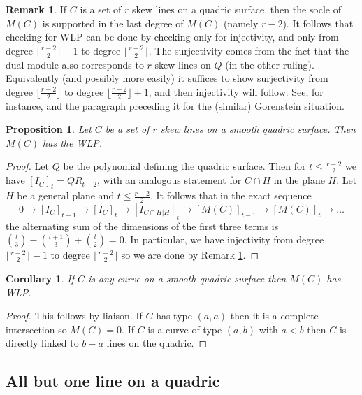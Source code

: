 \documentclass[12pt]{amsart}%
\numberwithin{equation}{section}
\newtheorem{proposition}[theorem]{Proposition}
\newtheorem{corollary}[theorem]{Corollary}
\theoremstyle{definition}
\newtheorem{remark}[theorem]{Remark}
\numberwithin{equation}{section}
\begin{document}
\begin{remark} \label{enough}
    If $C$ is a set of $r$ skew lines on a quadric surface, then the socle of $M(C)$ is supported in the last degree of $M(C)$ (namely $r-2$). It follows that checking for WLP can be done by checking only for injectivity, and only from degree $\lfloor \frac{r-2}{2} \rfloor -1$ to degree $\lfloor \frac{r-2}{2} \rfloor$. The surjectivity comes from the fact that the dual module also corresponds to $r$ skew lines on $Q$ (in the other ruling). Equivalently (and possibly more easily) it suffices to show surjectivity from degree $\lfloor \frac{r-2}{2} \rfloor$ to degree $\lfloor \frac{r-2}{2} \rfloor +1$, and then injectivity will follow. See, for instance, \cite[Proposition 2.6]{BMMN}  and the paragraph preceding it for the (similar) Gorenstein situation.
\end{remark}
\begin{proposition}\label{prop:lines quadric}
    Let $C$ be a set of $r$ skew lines on a smooth quadric surface. Then $M(C)$ has the WLP.
\end{proposition}
\begin{proof}
    Let $Q$ be the polynomial defining the quadric surface. Then for $t\leq \frac{r-2}{2}$ we have $[I_{C}]_t=QR_{t-2}$, with an analogous statement for $C \cap H$ in the plane $H$. Let $H$ be a general plane and $t\leq \frac{r-2}{2}$. It follows that in the exact sequence $$
    0\to [I_C]_{t-1}\to [I_C]_t\to [I_{C\cap H | H}]_t\to [M(C)]_{t-1}\to [M(C)]_t\to\dots
    $$
    the alternating sum of the dimensions of the first three terms is $\binom{t}{3}-\binom{t+1}{3}+\binom{t}{2}=0$. In particular, we have injectivity from degree $\lfloor \frac{r-2}{2}\rfloor-1$ to degree $\lfloor \frac{r-2}{2}\rfloor$ so we are done by Remark \ref{enough}. 
\end{proof}

\begin{corollary} \label{curve on quadric}
    If $C$ is any curve on a smooth quadric surface then $M(C)$ has WLP. 
\end{corollary}

\begin{proof}
    This follows by liaison. If $C$ has type $(a,a)$ then it is a complete intersection so $M(C) = 0$. If $C$ is a curve of type $(a,b)$ with $a < b$ then $C$ is directly linked to $b-a$ lines on the quadric.
\end{proof}



\subsection{All but one line on a quadric}
\end{document}
